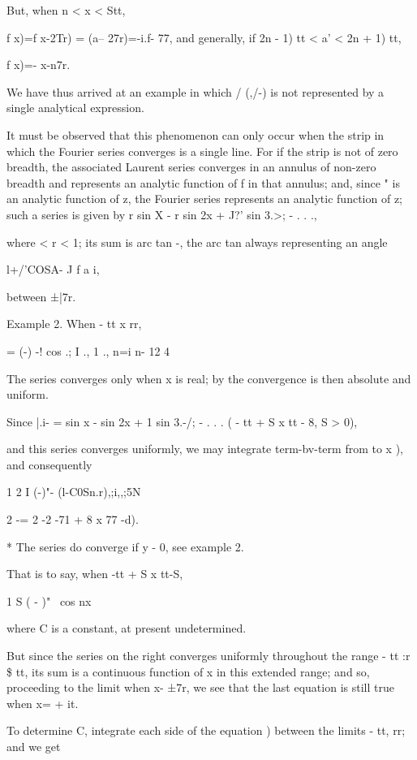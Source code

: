 But, when n < x < Stt,

f x)=f x-2Tr) = (a-- 27r)=-i.f- 77, and generally, if 2n - 1) tt < a'
< 2n + 1) tt,

f x)=- x-n7r.

We have thus arrived at an example in which / (,/-) is not represented
by a single analytical expression.

It must be observed that this phenomenon can only occur when the strip
in which the Fourier series converges is a single line. For if the
strip is not of zero breadth, the associated Laurent series converges
in an annulus of non-zero breadth and represents an analytic function
of f in that annulus; and, since " is an analytic function of z, the
Fourier series represents an analytic function of z; such a series is
given by r sin X - r sin 2x + J?' sin 3.>; - . . .,

where < r < 1; its sum is arc tan -, the arc tan always representing
an angle

l+/'COSA- J f a i,

between ±|7r.

Example 2. When - tt x rr,

= (-) -! cos .; I ., 1 ., n=i n- 12 4

The series converges only when x is real; by the convergence
is then absolute and uniform.

Since |.i- = sin x - sin 2x + 1 sin 3.-/; - . . . ( - tt + S x tt - 8,
S > 0),

and this series converges uniformly, we may integrate term-bv-term
from to x ), and consequently

1 2 I (-)"- (l-C0Sn.r),;i,,;5N

2 -= 2 -2 -71 + 8 x 77 -d).

* The series do converge if y - 0, see example 2.

%
%

That is to say, when -tt + S x tt-S,

  1 S ( - )"~ cos nx

where C is a constant, at present undetermined.

But since the series on the right converges uniformly throughout the
range - tt :r \$ tt, its sum is a continuous function of x in this
extended range; and so, proceeding to the limit when x- ±7r, we see
that the last equation is still true when x= + it.

To determine C, integrate each side of the equation ) between
the limits - tt, rr; and we get


